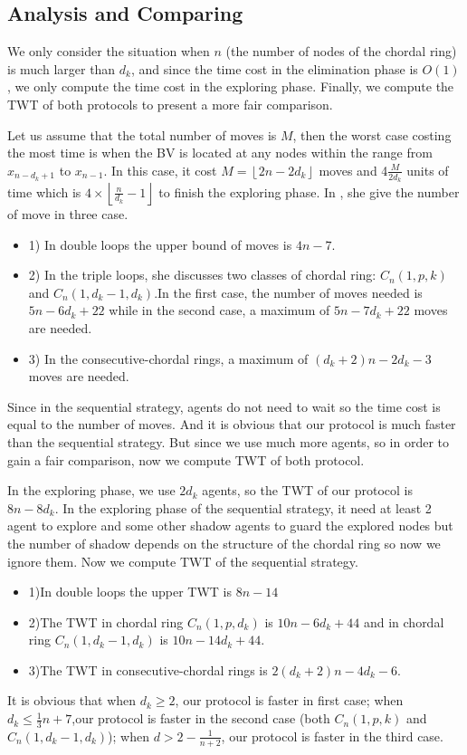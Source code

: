  
\subsection{Analysis and Comparing}


We only consider the situation when $n$ (the number of nodes of the chordal ring) is much larger than $d_k$, and since the time cost in the elimination phase is $O(1)$, we only compute the time cost in the exploring phase. Finally, we compute the TWT of both protocols to present a more fair comparison.

Let us assume that the total number of moves is $M$, then the worst case costing the most time is when the BV is located at any nodes within the range from $x_{n-d_k+1}$ to $x_{n-1}$. In this case, it cost $M=\left \lfloor 2n-2d_k\right \rfloor$ moves and 4$\frac{M}{2d_k}$ units of time which is $4\times \left \lfloor \frac{n}{d_k}-1\right \rfloor$ to finish the exploring phase. 
In \cite{Alotaibi}, she give the number of move in three case.
\begin{itemize}
\item 1) In double loops the upper bound of moves is $4n-7$.
\item 2) In the triple loops, she discusses two classes of chordal ring: $C_n(1,p,k)$ and $C_n(1,d_k-1,d_k)$.In the first case, the number of moves needed is $5n-6d_k+22$ while in the second case, a maximum of $5n-7d_k+22$ moves are needed.
\item 3) In the consecutive-chordal rings, a maximum of $(d_k+2)n-2d_k-3$ moves are needed.
\end{itemize}
Since in the sequential strategy, agents do not need to wait so the time cost is equal to the number of moves. And it is obvious that our protocol is much faster than the sequential strategy. But since we use much more agents, so in order to gain a fair comparison, now we compute TWT of both protocol.

In the exploring phase, we use $2d_k$ agents, so the TWT of our protocol is $8n-8d_k$. In the exploring phase of the sequential strategy, it need at least 2 agent to explore and some other shadow agents to guard the explored nodes but the number of shadow depends on the structure of the chordal ring so now we ignore them. Now we compute TWT of the sequential strategy.
\begin{itemize}
\item 1)In double loops the upper TWT is $8n-14$
\item 2)The TWT in chordal ring $C_n(1,p,d_k)$ is $10n-6d_k+44$ and in chordal ring $C_n(1,d_k-1,d_k)$ is $10n-14d_k+44$.
\item 3)The TWT in consecutive-chordal rings is $2(d_k+2)n-4d_k-6$.
\end{itemize}
It is obvious that when $d_k\geq 2$, our protocol is faster in first case; when $d_k\leq \frac{1}{3}n+7$,our protocol is faster in the second case (both $C_n(1,p,k)$ and $C_n(1,d_k-1,d_k)$); when $d>2-\frac{1}{n+2}$, our protocol is faster in the third case.


